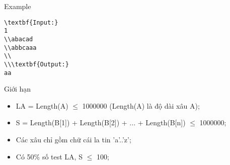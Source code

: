 Example
\begin{verbatim}
\textbf{Input:}
1
\\abacad
\\abbcaaa
\\
\\\textbf{Output:}
aa\end{verbatim}
Giới hạn
\begin{itemize}
	\item     LA = Length(A)  $\le$  1000000 (Length(A) là độ dài xâu A);   
	\item     S = Length(B[1]) + Length(B[2]) + ... + Length(B[n])  $\le$  1000000;   
	\item     Các xâu chỉ gồm chữ cái la tin 'a'..'z';   
	\item     Có 50\% số test LA, S  $\le$  100;   
\end{itemize}